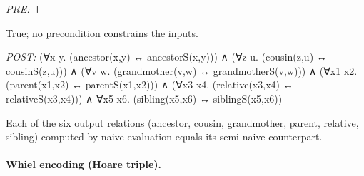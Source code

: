 \documentclass[10pt]{article}
\begin{document}
\textit{PRE:} ⊤\par True; no precondition constrains the inputs.

\textit{POST:} (∀x y. (ancestor(x,y) ↔ ancestorS(x,y))) ∧ (∀z u. (cousin(z,u) ↔ cousinS(z,u))) ∧ (∀v w. (grandmother(v,w) ↔ grandmotherS(v,w))) ∧ (∀x1 x2. (parent(x1,x2) ↔ parentS(x1,x2))) ∧ (∀x3 x4. (relative(x3,x4) ↔ relativeS(x3,x4))) ∧ ∀x5 x6. (sibling(x5,x6) ↔ siblingS(x5,x6))\par Each of the six output relations (ancestor, cousin, grandmother, parent, relative, sibling) computed by naive evaluation equals its semi-naive counterpart.

\paragraph{Whiel encoding (Hoare triple).}
\end{document}
